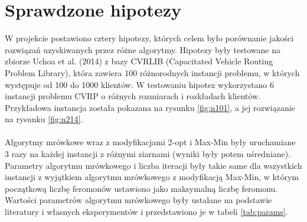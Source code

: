 \documentclass{article}
\begin{document}
\section{Sprawdzone hipotezy}
W projekcie postawiono cztery hipotezy, których celem było porównanie jakości rozwiązań uzyskiwanych przez różne algorytmy. Hipotezy były testowane na zbiorze Uchoa et al. (2014) \cite{Uchoa} z bazy CVRLIB (Capacitated Vehicle Routing Problem Library), która zawiera 100 różnorodnych instancji problemu, w których występuje od 100 do 1000 klientów. W testowaniu hipotez wykorzystano 6 instancji problemu CVRP o różnych rozmiarach i rozkładach klientów. Przykładowa instancja została pokazana na rysunku \ref{fig:n101}, a jej rozwiązanie na rysunku \ref{fig:n214}. 
\\ \\
Algorytmy mrówkowe wraz z modyfikacjami 2-opt i Max-Min były uruchamiane 3 razy na każdej instancji z różnymi ziarnami (wyniki były potem uśredniane). Parametry algorytmu mrówkowego i liczba iteracji były takie same dla wszystkich instancji z wyjątkiem algorytmu mrówkowego z modyfikacją Max-Min, w którym początkową liczbę feromonów ustawiono jako maksymalną liczbę feromonu. Wartości parametrów algorytmu mrówkowego były ustalane na podstawie literatury i własnych eksperymentów i przedstawiono je w tabeli \ref{tab:params}.
\end{document}

